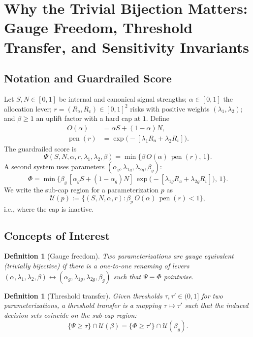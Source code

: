 \documentclass[12pt,a4paper]{article}
\newtheorem{definition}[theorem]{Definition}
\begin{document}
\section{Why the Trivial Bijection Matters: Gauge Freedom, Threshold Transfer, and Sensitivity Invariants}

\subsection{Notation and Guardrailed Score}
Let $S,N\in[0,1]$ be internal and canonical signal strengths; $\alpha\in[0,1]$ the allocation lever; $r=(R_a,R_v)\in[0,1]^2$ risks with positive weights $(\lambda_1,\lambda_2)$; and $\beta\ge 1$ an uplift factor with a hard cap at $1$. Define
\begin{align*}
O(\alpha) &= \alpha S + (1-\alpha)N, \\
\operatorname{pen}(r) &= \exp\!\big(-[\lambda_1 R_a + \lambda_2 R_v]\big).
\end{align*}
The guardrailed score is
\[
\Psi(S,N,\alpha,r,\lambda_1,\lambda_2,\beta) = \min\{\beta\,O(\alpha)\,\operatorname{pen}(r),\,1\}.
\]
A second system uses parameters $(\alpha_g,\lambda_{1g},\lambda_{2g},\beta_g)$:
\[
\Phi = \min\Big\{\beta_g\,[\alpha_g S + (1-\alpha_g)N] \, \exp\!\big(-[\lambda_{1g}R_a + \lambda_{2g}R_v]\big),\, 1\Big\}.
\]
We write the sub-cap region for a parameterization $p$ as
\[
\mathcal{U}(p) := \{(S,N,\alpha,r) : \beta_p\,O(\alpha)\,\operatorname{pen}(r) < 1\},
\]
i.e., where the cap is inactive.

\subsection{Concepts of Interest}
\begin{definition}[Gauge freedom]
Two parameterizations are gauge equivalent (trivially bijective) if there is a one-to-one renaming of levers $(\alpha,\lambda_1,\lambda_2,\beta) \leftrightarrow (\alpha_g,\lambda_{1g},\lambda_{2g},\beta_g)$ such that $\Psi \equiv \Phi$ pointwise.
\end{definition}

\begin{definition}[Threshold transfer]
Given thresholds $\tau,\tau'\in(0,1]$ for two parameterizations, a threshold transfer is a mapping $\tau\mapsto\tau'$ such that the induced decision sets coincide on the sub-cap region:
\[
\{\Psi \ge \tau\}\cap \mathcal{U}(\beta) = \{\Phi \ge \tau'\}\cap \mathcal{U}(\beta_g).
\]
\end{definition}
\end{document}
